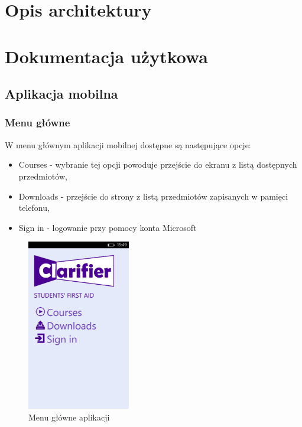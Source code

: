 \documentclass{pracamgr}
\begin{document}
\chapter{Opis architektury}\label{r:architecture}

\chapter{Dokumentacja użytkowa}\label{r:documentation}

\section{Aplikacja mobilna}

\subsection{Menu główne}
W menu głównym aplikacji mobilnej dostępne są następujące opcje:
\begin{itemize}
\item Courses - wybranie tej opcji powoduje przejście do ekranu z listą dostępnych przedmiotów,
\item Downloads - przejście do strony z listą przedmiotów zapisanych w pamięci telefonu,
\item Sign in - logowanie przy pomocy konta Microsoft
\end{itemize}

\begin{figure}[h]
    \centering
    \includegraphics[width=0.4\textwidth]{Main_menu.png}
    \caption{Menu główne aplikacji}
    \label{fig:main_menu}
\end{figure}
\end{document}
